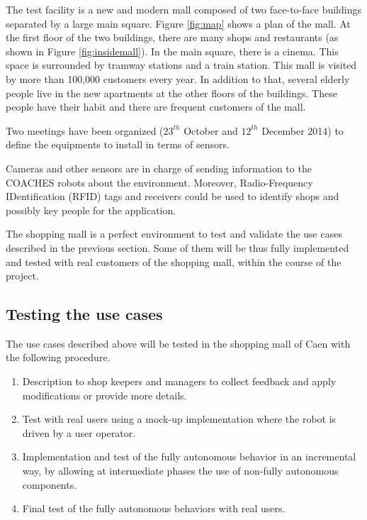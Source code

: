 The test facility is a new and modern mall composed of two face-to-face buildings separated by a large main square. Figure \ref{fig:map} shows a plan of the mall.
At the first floor of the two buildings, there are many shops and restaurants (as shown in Figure \ref{fig:insidemall}). In the main square, there is a cinema. This space is surrounded by tramway stations and a train station. This mall is visited by more than 100,000 customers every year. In addition to that, several elderly people live in the new apartments at the other floors of the buildings. These people have their habit and there are frequent customers of the mall. 

Two meetings have been organized ($23^{th}$ October and $12^{th}$ December 2014) to define the equipments to install in terms of sensors.

Cameras and other sensors are in charge of sending information to the COACHES robots about the environment.
Moreover, Radio-Frequency IDentification (RFID) tags and receivers could be used to identify shops and possibly key people for the application.

The shopping mall is a perfect environment to test and validate the use cases described in the previous section. Some of them will be thus fully implemented and tested with real customers of the shopping mall, within the course of the project.



\subsection{Testing the use cases}

The use cases described above will be tested in the shopping mall of Caen with the following procedure.
\begin{enumerate}
\item Description to shop keepers and managers to collect feedback and apply modifications or provide more details.
\item Test with real users using a mock-up implementation where the robot is driven by a user operator.
\item Implementation and test of the fully autonomous behavior in an incremental way, by allowing at intermediate phases the use of non-fully autonomous components.
\item Final test of the fully autonomous behaviors with real users.
\end{enumerate}



